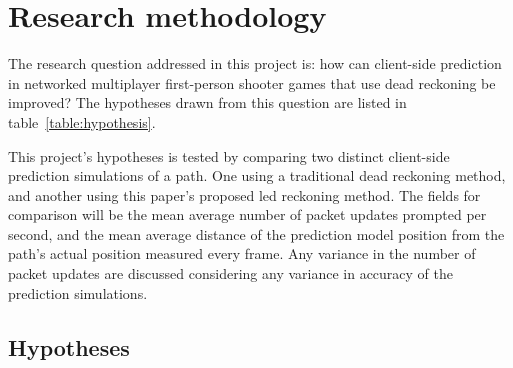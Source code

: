 \documentclass[journal]{IEEEtran}
\begin{document}
\section{Research methodology} \label{researchmethodology}

The research question addressed in this project is: how can client-side prediction in networked multiplayer first-person shooter games that use dead reckoning be improved? The hypotheses drawn from this question are listed in table~\ref{table:hypothesis}.

This project's hypotheses is tested by comparing two distinct client-side prediction simulations of a path. One using a traditional dead reckoning method, and another using this paper's proposed led reckoning method. The fields for comparison will be the mean average number of packet updates prompted per second, and the mean average distance of the prediction model position from the path's actual position measured every frame. Any variance in the number of packet updates are discussed considering any variance in accuracy of the prediction simulations.

\subsection{Hypotheses} \label{hypothesis}
\end{document}
